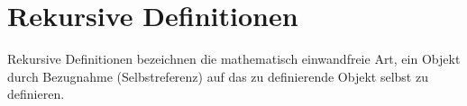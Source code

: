 \section{Rekursive Definitionen}




Rekursive Definitionen bezeichnen die mathematisch einwandfreie Art, ein Objekt durch Bezugnahme (Selbstreferenz) auf das zu definierende Objekt selbst zu definieren.

